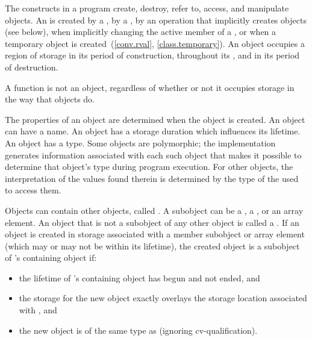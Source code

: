 \pnum
{}%
The constructs in a \Cpp{} program create, destroy, refer to, access, and
manipulate objects.
An  is created
by a ,
by a ,
by an operation that implicitly creates objects (see below),
when implicitly changing the active member of a ,
or
when a temporary object is created~(\ref{conv.rval}, \ref{class.temporary}).
An object occupies a region of storage
in its period of construction,
throughout its ,
and
in its period of destruction.
\begin{note}
A function is not an object, regardless of whether or not it
occupies storage in the way that objects do.
\end{note}
The properties of an
object are determined when the object is created. An object can have a
name. An object has a storage
duration which influences its
lifetime. An object has a
type.
Some objects are
polymorphic; the implementation
generates information associated with each such object that makes it
possible to determine that object's type during program execution. For
other objects, the interpretation of the values found therein is
determined by the type of the 
used to access them.

\pnum
{}%
Objects can contain other objects, called .
A subobject can be
a , a ,
or an array element.
%
An object that is not a subobject of any other object is called a .
If an object is created
in storage associated with a member subobject or array element 
(which may or may not be within its lifetime),
the created object
is a subobject of 's containing object if:
\begin{itemize}
\item
the lifetime of 's containing object has begun and not ended, and
\item
the storage for the new object exactly overlays the storage location associated with , and
\item
the new object is of the same type as  (ignoring cv-qualification).
\end{itemize}

